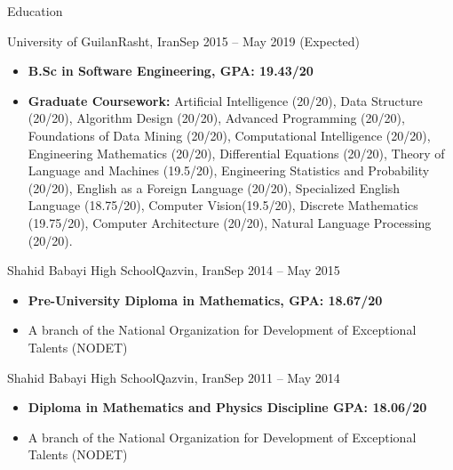 \documentclass[]{mcdowellcv}
\begin{document}
	\makeheader
	

    \begin{cvsection}{Education}
    	\begin{cvsubsection}{University of Guilan}{Rasht, Iran}{Sep 2015 -- May 2019 (Expected)}
    	    \setlength{\columnsep}{-2.1in}
    		\begin{itemize}
    			\item \textbf{B.Sc in Software Engineering, GPA: 19.43/20 }
    			\item \textbf{Graduate Coursework:} Artificial Intelligence (20/20), Data Structure (20/20), Algorithm Design (20/20), Advanced Programming (20/20), Foundations of Data Mining (20/20), Computational Intelligence (20/20), Engineering Mathematics (20/20), Differential Equations (20/20), Theory of Language and Machines (19.5/20), Engineering Statistics and Probability (20/20), English as a Foreign Language (20/20), Specialized English Language (18.75/20), Computer Vision(19.5/20), Discrete Mathematics (19.75/20), Computer Architecture (20/20), Natural Language Processing (20/20).
    		\end{itemize}
    	\end{cvsubsection}
    	
    	\begin{cvsubsection}{Shahid Babayi High School}{Qazvin, Iran}{Sep 2014 -- May 2015}
    	    \setlength{\columnsep}{-2.1in}
    		\begin{itemize}
    			\item \textbf{Pre-University Diploma in Mathematics, GPA: 18.67/20}
    			\item A branch of the National Organization for Development of Exceptional Talents (NODET) 
    		\end{itemize}
    	\end{cvsubsection}
    	
    	\begin{cvsubsection}{Shahid Babayi High School}{Qazvin, Iran}{Sep 2011 -- May 2014}
    	    \setlength{\columnsep}{-2.1in}
    		\begin{itemize}
    			\item \textbf{Diploma in Mathematics and Physics Discipline GPA: 18.06/20}
    			\item A branch of the National Organization for Development of Exceptional Talents (NODET) 
    		\end{itemize}
    	\end{cvsubsection}
    \end{cvsection}
	
\end{document}

